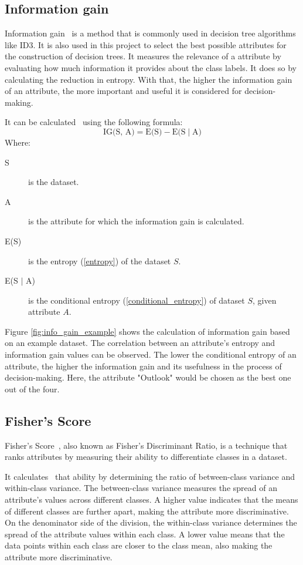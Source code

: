 \subsection{Information gain} \label{information_gain}
Information gain~\cite{feature_selection} is a method that is commonly used in decision tree algorithms like ID3. It is also used in this project to select the best possible attributes for the construction of decision trees. It measures the relevance of a attribute by evaluating how much information it provides about the class labels. It does so by calculating the reduction in entropy. With that, the higher the information gain of an attribute, the more important and useful it is considered for decision-making.

It can be calculated~\cite{information_gain_wiki} using the following formula:
\[ \text{IG(S, A)} = \text{E(S)} - \text{E(S}\mid \text{A)}\]
Where:
\begin{description}
	\item[S] is the dataset.
	\item[A] is the attribute for which the information gain is calculated.
    \item[E(S)] is the entropy (\ref{entropy}) of the dataset $S$.
    \item[E(S $\mid$ A)] is the conditional entropy (\ref{conditional_entropy}) of dataset $S$, given attribute $A$.
\end{description}

Figure \ref{fig:info_gain_example} shows the calculation of information gain based on an example dataset.
The correlation between an attribute's entropy and information gain values can be observed. The lower the conditional entropy of an attribute, the higher the information gain and its usefulness in the process of decision-making. Here, the attribute "Outlook" would be chosen as the best one out of the four.

\subsection{Fisher's Score}
Fisher's Score~\cite{feature_selection}, also known as Fisher's Discriminant Ratio, is a technique that ranks attributes by measuring their ability to differentiate classes in a dataset.

It calculates~\cite{8abf67a05c864edc85fbc3af89c826a8} that ability by determining the ratio of between-class variance and within-class variance. The between-class variance measures the spread of an attribute's values across different classes. A higher value indicates that the means of different classes are further apart, making the attribute more discriminative. On the denominator side of the division, the within-class variance determines the spread of the attribute values within each class. A lower value means that the data points within each class are closer to the class mean, also making the attribute more discriminative.


